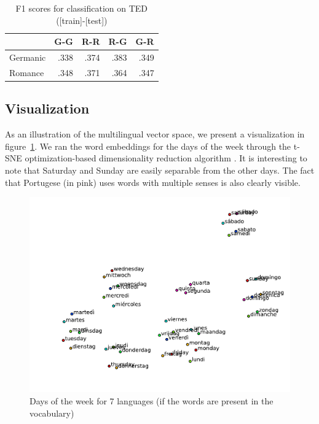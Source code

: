 \begin{table}[ht]
\center
\setlength\tabcolsep{2pt}
\begin{tabular}{l | r r r r}
		&G-G	&R-R	&R-G	&G-R	\\\hline
Germanic		&.338		&.374		&.383		&.349		\\
Romance		&.348		&.371		&.364		&.347		\\
\end{tabular}
\caption{F1 scores for classification on TED ([train]-[test])}
\label{t:dbow_families}
\end{table}



\subsection{Visualization}

As an illustration of the multilingual vector space, we present a visualization in figure~\ref{f:weekdays}.
We ran the word embeddings for the days of the week through the t-SNE optimization-based dimensionality reduction algorithm \cite{van2008visualizing}.
It is interesting to note that Saturday and Sunday are easily separable from the other days.
The fact that Portugese (in pink) uses words with multiple senses is also clearly visible.

\begin{figure}
\center
\includegraphics[width=1\linewidth]{figures/weekdays7}
\caption{Days of the week for 7 languages (if the words are present in the vocabulary)}
\label{f:weekdays}
\end{figure}
